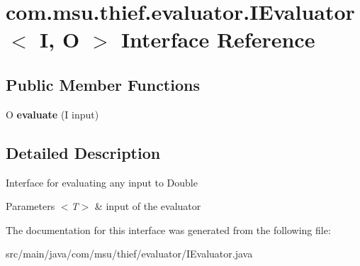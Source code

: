 \hypertarget{interfacecom_1_1msu_1_1thief_1_1evaluator_1_1IEvaluator_3_01I_00_01O_01_4}{\section{com.\-msu.\-thief.\-evaluator.\-I\-Evaluator$<$ I, O $>$ Interface Reference}
\label{interfacecom_1_1msu_1_1thief_1_1evaluator_1_1IEvaluator_3_01I_00_01O_01_4}
}
\subsection*{Public Member Functions}
\begin{DoxyCompactItemize}
\item 
\hypertarget{interfacecom_1_1msu_1_1thief_1_1evaluator_1_1IEvaluator_3_01I_00_01O_01_4_a68d80ccfa17903fc1f1d3391084e7a35}{O {\bfseries evaluate} (I input)}\label{interfacecom_1_1msu_1_1thief_1_1evaluator_1_1IEvaluator_3_01I_00_01O_01_4_a68d80ccfa17903fc1f1d3391084e7a35}

\end{DoxyCompactItemize}


\subsection{Detailed Description}
Interface for evaluating any input to Double 
\begin{DoxyParams}{Parameters}
{\em $<$\-T$>$} & input of the evaluator \\
\hline
\end{DoxyParams}


The documentation for this interface was generated from the following file\-:\begin{DoxyCompactItemize}
\item 
src/main/java/com/msu/thief/evaluator/I\-Evaluator.\-java\end{DoxyCompactItemize}
